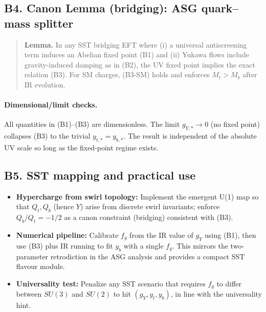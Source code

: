 \documentclass[11pt]{article}
\begin{document}
      \subsection*{B4. Canon Lemma (bridging): ASG quark–mass splitter}
          \begin{quote}
          \textbf{Lemma.} In any SST bridging EFT where (i) a universal antiscreening term induces an Abelian fixed point (B1) and (ii) Yukawa flows include gravity-induced damping as in (B2), the UV fixed point implies the exact relation (B3). For SM charges, (B3-SM) holds and enforces $M_t\!>\!M_b$ after IR evolution.
          \end{quote}

          \paragraph{Dimensional/limit checks.} All quantities in (B1)–(B3) are dimensionless. The limit $g_{Y,*}\!\to\!0$ (no fixed point) collapses (B3) to the trivial $y_{t,*}=y_{b,*}$. The result is independent of the absolute UV scale so long as the fixed-point regime exists.

  \subsection*{B5. SST mapping and practical use}
      \begin{itemize}
      \item \textbf{Hypercharge from swirl topology:} Implement the emergent U(1) map so that $Q_t, Q_b$ (hence $Y$) arise from discrete swirl invariants; enforce $Q_b/Q_t=-1/2$ as a canon constraint (bridging) consistent with (B3).
      \item \textbf{Numerical pipeline:} Calibrate $f_g$ from the IR value of $g_Y$ using (B1), then use (B3) plus IR running to fit $y_b$ with a single $f_y$. This mirrors the two-parameter retrodiction in the ASG analysis and provides a compact SST flavour module.
      \item \textbf{Universality test:} Penalize any SST scenario that requires $f_g$ to differ between $SU(3)$ and $SU(2)$ to hit $(g_Y,y_t,y_b)$, in line with the universality hint.
      \end{itemize}
\end{document}

